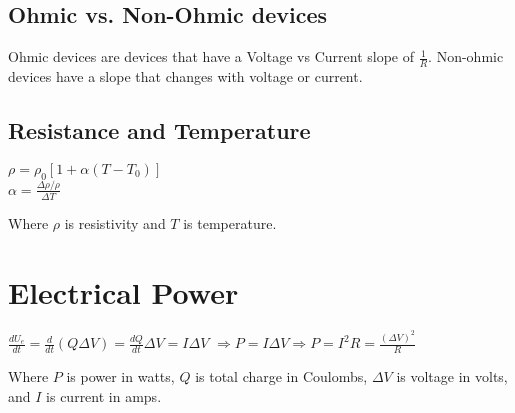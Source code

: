 \documentclass[12pt]{article}
\begin{document}
\subsection*{Ohmic vs. Non-Ohmic devices}
\hspace{.5cm} Ohmic devices are devices that have a Voltage vs Current slope of $\frac{1}{R}$. Non-ohmic devices have a slope that changes with voltage or current.\\

\subsection*{Resistance and Temperature}
\vbox{
    \large\center
    $\rho = \rho_0[1+\alpha (T-T_0)]$\\
    \vspace{12pt}
    $\alpha = \frac{\Delta \rho/\rho}{\Delta T}$
}
\vspace{12pt}

Where $\rho$ is resistivity and $T$ is temperature.


\section{Electrical Power}
$\frac{dU_e}{dt} = \frac{d}{dt} (Q\Delta V) = \frac{dQ}{dt}\Delta V = I\Delta V$
\newline\newline
$\Rightarrow P = I\Delta V \Rightarrow P = I^2R = \frac{(\Delta V)^2}{R}$

Where $P$ is power in watts, $Q$ is total charge in Coulombs, $\Delta V$ is voltage in volts, and $I$ is current in amps.
\newline
\end{document}
